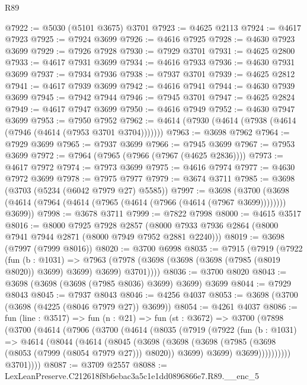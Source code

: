 \begin{lexlean}{R89}
\begin{coremodule}
@7922 := @5030 (@5101 @3675) @3701
@7923 := @4625 @2113
@7924 := @4617 @7923
@7925 := @7924 @3699
@7926 := @4616 @7925
@7928 := @4630 @7923 @3699
@7929 := @7926 @7928
@7930 := @7929 @3701
@7931 := @4625 @2800
@7933 := @4617 @7931 @3699
@7934 := @4616 @7933
@7936 := @4630 @7931 @3699
@7937 := @7934 @7936
@7938 := @7937 @3701
@7939 := @4625 @2812
@7941 := @4617 @7939 @3699
@7942 := @4616 @7941
@7944 := @4630 @7939 @3699
@7945 := @7942 @7944
@7946 := @7945 @3701
@7947 := @4625 @2824
@7949 := @4617 @7947 @3699
@7950 := @4616 @7949
@7952 := @4630 @7947 @3699
@7953 := @7950 @7952
@7962 := @4614 (@7930 (@4614 (@7938 (@4614 (@7946 (@4614 (@7953 @3701 @3704)))))))
@7963 := @3698 @7962
@7964 := @7929 @3699
@7965 := @7937 @3699
@7966 := @7945 @3699
@7967 := @7953 @3699
@7972 := @7964 (@7965 (@7966 (@7967 (@4625 @2836))))
@7973 := @4617 @7972
@7974 := @7973 @3699
@7975 := @4616 @7974
@7977 := @4630 @7972 @3699
@7978 := @7975 @7977
@7979 := @3674 @3711
@7985 := @3698 (@3703 (@5234 (@6042 @7979 @27) @5585))
@7997 := @3698
    (@3700 (@3698 (@4614 (@7964 (@4614 (@7965 (@4614 (@7966 (@4614 (@7967 @3699)))))))) @3699))
@7998 := @3678 @3711
@7999 := @7822 @7998
@8000 := @4615 @3517
@8016 := @8000
    @7925
    @7928
    @2857
    (@8000 @7933 @7936 @2864 (@8000 @7941 @7944 @2871 (@8000 @7949 @7952 @2881 @2240)))
@8019 := @3698 (@7997 (@7999 @8016))
@8020 := @3700 @6998
@8035 := @7915
    (@7919
      (@7922
        (fun (b : @1031) =>
        @7963 (@7978 (@3698 (@3698 (@3698 (@7985 (@8019 @8020)) @3699) @3699) @3699) @3701))))
@8036 := @3700 @8020
@8043 := @3698 (@3698 (@3698 (@7985 @8036) @3699) @3699) @3699
@8044 := @7929 @8043
@8045 := @7937 @8043
@8046 := @4256 @4037
@8053 := @3698 (@3700 (@3698 (@4225 (@8046 @7979 @27)) @3699))
@8054 := @4261 @4037
@8086 := fun (line : @3517) =>
  fun (n : @21) =>
  fun (st : @3672) =>
  @3700
    (@7898
      (@3700
        (@4614
          (@7906
            (@3700
              (@4614
                (@8035
                  (@7919
                    (@7922
                      (fun (b : @1031) =>
                      @4614
                        (@8044
                          (@4614
                            (@8045
                              (@3698
                                (@3698
                                  (@3698
                                    (@7985 (@3698 (@8053 (@7999 (@8054 @7979 @27))) @8020))
                                    @3699)
                                  @3699)
                                @3699))))))))))
            @3701))))
@8087 := @3709 @2557
@8088 := LexLeanPreserve.C212618f8b6ebac3a5c1e1dd0896866e7.R89.__enc_5

\end{coremodule}
\end{lexlean}
